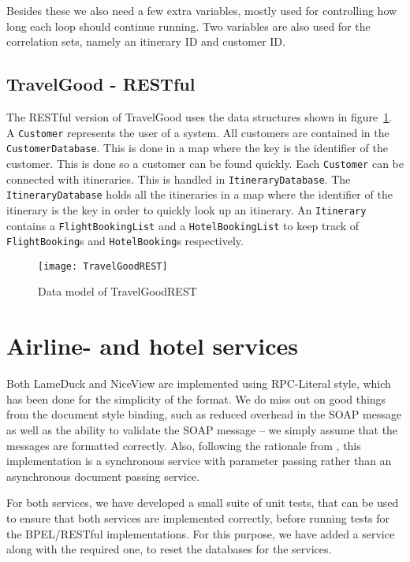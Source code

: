 Besides these we also need a few extra variables, mostly used for controlling how long each loop should continue running. Two variables are also used for the correlation sets, namely an itinerary ID and customer ID.

\subsection{TravelGood - RESTful}
The RESTful version of TravelGood uses the data structures shown in figure~\ref{fig:rest_class}. A \texttt{Customer} represents the user of a system. All customers are contained in the \texttt{Customer\-Database}. This is done in a map where the key is the identifier of the customer. This is done so a customer can be found quickly. Each \texttt{Customer} can be connected with itineraries. This is handled in \texttt{ItineraryDatabase}. The \texttt{ItineraryDatabase} holds all the itineraries in a map where the identifier of the itinerary is the key in order to quickly look up an itinerary. An \texttt{Itinerary} contains a \texttt{FlightBookingList} and a \texttt{HotelBookingList} to keep track of \texttt{FlightBooking}s and \texttt{HotelBooking}s respectively.

\begin{figure}[H]
\centering
\texttt{[image: TravelGoodREST]}
\caption{Data model of TravelGoodREST}
\label{fig:rest_class}
\end{figure}


\section{Airline- and hotel services}
Both LameDuck and NiceView are implemented using RPC-Literal style, which has been done for the simplicity of the format. We do miss out on good things from the document style binding, such as reduced overhead in the SOAP message as well as the ability to validate the SOAP message -- we simply assume that the messages are formatted correctly. 
Also, following the rationale from \cite{papazoglou2008web}, this implementation is a synchronous service with parameter passing rather than an asynchronous document passing service.

For both services, we have developed a small suite of unit tests, that can be used to ensure that both services are implemented correctly, before running tests for the BPEL/RESTful implementations. For this purpose, we have added a service along with the required one, to reset the databases for the services.\medskip

